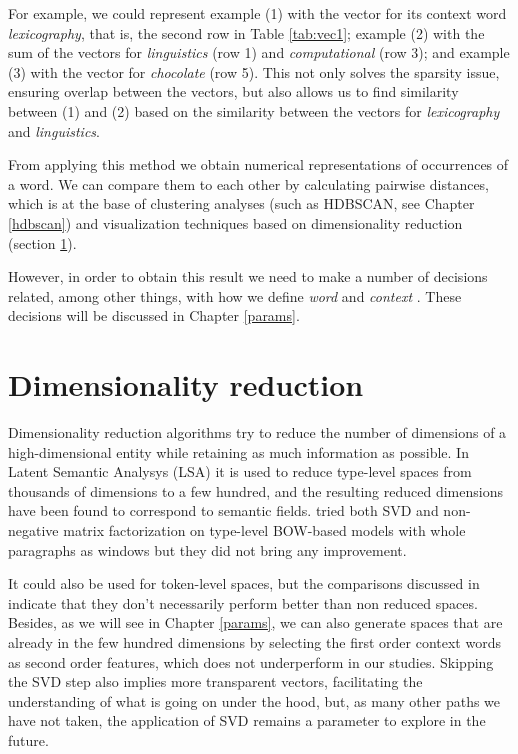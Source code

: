 \documentclass[
]{book}
\begin{document}
For example, we could represent example (1) with the vector for its context word \emph{lexicography}, that is, the second row in Table \ref{tab:vec1}; example (2) with the sum of the vectors for \emph{linguistics} (row 1) and \emph{computational} (row 3); and example (3) with the vector for \emph{chocolate} (row 5). This not only solves the sparsity issue, ensuring overlap between the vectors, but also allows us to find similarity between (1) and (2) based on the similarity between the vectors for \emph{lexicography} and \emph{linguistics}.

From applying this method we obtain numerical representations of occurrences of a word. We can compare them to each other by calculating pairwise distances, which is at the base of clustering analyses (such as HDBSCAN, see Chapter \ref{hdbscan}) and visualization techniques based on dimensionality reduction (section \ref{dim-reduction}).

However, in order to obtain this result we need to make a number of decisions related, among other things, with how we define \emph{word} and \emph{context} \autocite[Cf.][ 83]{bolognesi_2020}. These decisions will be discussed in Chapter \ref{params}.

\hypertarget{dim-reduction}{%
\section{Dimensionality reduction}\label{dim-reduction}}

Dimensionality reduction algorithms try to reduce the number of dimensions of a high-dimensional entity while retaining as much information as possible. In Latent Semantic Analysys (LSA)
it is used to reduce type-level spaces from thousands of dimensions to a few hundred, and the resulting reduced dimensions have been found to correspond to semantic fields.
\textcite{vandecruys_2008} tried both SVD and non-negative matrix factorization on type-level BOW-based models with whole paragraphs as windows but they did not bring any improvement.

It could also be used for token-level spaces, but the comparisons discussed in \textcite[246]{depascale_2019} indicate that they don't necessarily perform better than non reduced spaces. Besides, as we will see in Chapter \ref{params}, we can also generate spaces that are already in the few hundred dimensions by selecting the first order context words as second order features, which does not underperform in our studies. Skipping the SVD step also implies more transparent vectors, facilitating the understanding of what is going on under the hood, but, as many other paths we have not taken, the application of SVD remains a parameter to explore in the future.
\end{document}
